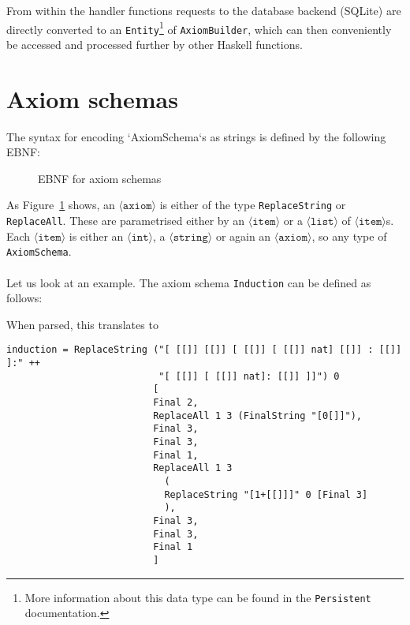 \documentclass[notitlepage]{report}
\newcommand\m[1]{\texttt{#1}}
\begin{document}
From within the handler functions requests to the database backend (SQLite) are
directly converted to an \m{Entity}\footnote{More information about this data
type can be found in the \texttt{Persistent} documentation.} of \m{AxiomBuilder},
which can then conveniently be accessed and processed further by other Haskell
functions.

\pagebreak
\section{Axiom schemas}\label{sec:axiom_schemas}

The syntax for encoding `AxiomSchema`s as strings is defined by the following
EBNF:
\begin{figure}[h!]
    {\renewcommand{\arraystretch}{2.0}
    }
    \caption{EBNF for axiom schemas}\label{fig:EBNFaxiom}
\end{figure}

As Figure~\ref{fig:EBNFaxiom} shows, an $\langle \texttt{axiom} \rangle$ is either
of the type \m{ReplaceString} or \m{ReplaceAll}. These are parametrised either
by an $\langle \texttt{item} \rangle$ or a $\langle \texttt{list} \rangle$
of $\langle \texttt{item} \rangle$s. Each $\langle \texttt{item} \rangle$ is
either an $\langle \texttt{int} \rangle$, a $\langle \texttt{string} \rangle$
or again an $\langle \texttt{axiom} \rangle$, so any type of \m{AxiomSchema}.
\\\\
Let us look at an example. The axiom schema \texttt{Induction} can be defined as
follows:

When parsed, this translates to
\begin{verbatim}
induction = ReplaceString ("[ [[]] [[]] [ [[]] [ [[]] nat] [[]] : [[]] ]:" ++
                           "[ [[]] [ [[]] nat]: [[]] ]]") 0
                          [
                          Final 2,
                          ReplaceAll 1 3 (FinalString "[0[]]"),
                          Final 3,
                          Final 3,
                          Final 1,
                          ReplaceAll 1 3
                            (
                            ReplaceString "[1+[[]]]" 0 [Final 3]
                            ),
                          Final 3,
                          Final 3,
                          Final 1
                          ]
\end{verbatim}
\end{document}
